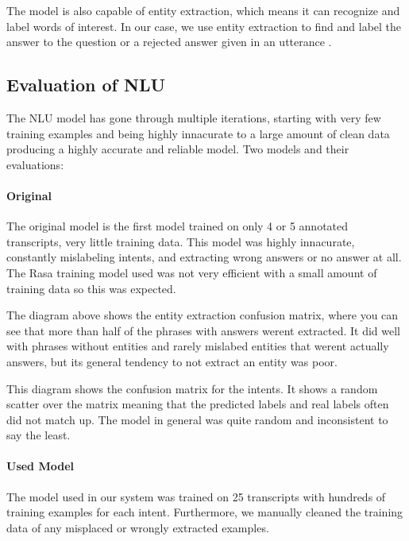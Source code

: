\documentclass[hidelinks, 11pt]{article}
\begin{document}
The model is also capable of entity extraction, which means it can recognize and label words of interest. In our case, we use entity extraction to find and label the answer to the question or a rejected answer given in an utterance .

\subsection{Evaluation of NLU}
\label{subsec:NLU_evaluation}

The NLU model has gone through multiple iterations, starting with very few training examples and being highly innacurate to a large amount of clean data producing a highly accurate and reliable model. Two models and their evaluations:

\paragraph{Original} The original model is the first model trained on only 4 or 5 annotated transcripts, very little training data.
This model was highly innacurate, constantly mislabeling intents, and extracting wrong answers or no answer at all.
The Rasa training model used was not very efficient with a small amount of training data so this was expected.

The diagram above shows the entity extraction confusion matrix, where you can see that more than half of the phrases with answers werent extracted.
It did well with phrases without entities and rarely mislabed entities that werent actually answers, but its general tendency to not extract an entity was poor.

This diagram shows the confusion matrix for the intents.
It shows a random scatter over the matrix meaning that the predicted labels and real labels often did not match up.
The model in general was quite random and inconsistent to say the least.

\paragraph{Used Model} The model used in our system was trained on 25 transcripts with hundreds of training examples for each intent. Furthermore, we manually cleaned the training data of any misplaced or wrongly extracted examples.
\end{document}
